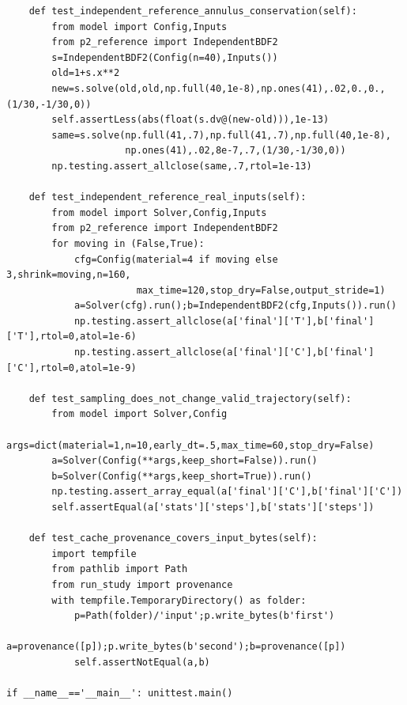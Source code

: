 \begin{verbatim}
    def test_independent_reference_annulus_conservation(self):
        from model import Config,Inputs
        from p2_reference import IndependentBDF2
        s=IndependentBDF2(Config(n=40),Inputs())
        old=1+s.x**2
        new=s.solve(old,old,np.full(40,1e-8),np.ones(41),.02,0.,0.,(1/30,-1/30,0))
        self.assertLess(abs(float(s.dv@(new-old))),1e-13)
        same=s.solve(np.full(41,.7),np.full(41,.7),np.full(40,1e-8),
                     np.ones(41),.02,8e-7,.7,(1/30,-1/30,0))
        np.testing.assert_allclose(same,.7,rtol=1e-13)

    def test_independent_reference_real_inputs(self):
        from model import Solver,Config,Inputs
        from p2_reference import IndependentBDF2
        for moving in (False,True):
            cfg=Config(material=4 if moving else 3,shrink=moving,n=160,
                       max_time=120,stop_dry=False,output_stride=1)
            a=Solver(cfg).run();b=IndependentBDF2(cfg,Inputs()).run()
            np.testing.assert_allclose(a['final']['T'],b['final']['T'],rtol=0,atol=1e-6)
            np.testing.assert_allclose(a['final']['C'],b['final']['C'],rtol=0,atol=1e-9)

    def test_sampling_does_not_change_valid_trajectory(self):
        from model import Solver,Config
        args=dict(material=1,n=10,early_dt=.5,max_time=60,stop_dry=False)
        a=Solver(Config(**args,keep_short=False)).run()
        b=Solver(Config(**args,keep_short=True)).run()
        np.testing.assert_array_equal(a['final']['C'],b['final']['C'])
        self.assertEqual(a['stats']['steps'],b['stats']['steps'])

    def test_cache_provenance_covers_input_bytes(self):
        import tempfile
        from pathlib import Path
        from run_study import provenance
        with tempfile.TemporaryDirectory() as folder:
            p=Path(folder)/'input';p.write_bytes(b'first')
            a=provenance([p]);p.write_bytes(b'second');b=provenance([p])
            self.assertNotEqual(a,b)

if __name__=='__main__': unittest.main()

\end{verbatim}

